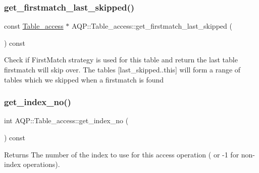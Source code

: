 \subsubsection{\texorpdfstring{get\+\_\+firstmatch\+\_\+last\+\_\+skipped()}{get\_firstmatch\_last\_skipped()}}
{\footnotesize\ttfamily const \mbox{\hyperlink{classAQP_1_1Table__access}{Table\+\_\+access}} $\ast$ A\+Q\+P\+::\+Table\+\_\+access\+::get\+\_\+firstmatch\+\_\+last\+\_\+skipped (\begin{DoxyParamCaption}{ }\end{DoxyParamCaption}) const}

Check if \textquotesingle{}First\+Match\textquotesingle{} strategy is used for this table and return the last table \textquotesingle{}firstmatch\textquotesingle{} will skip over. The tables \mbox{[}\textquotesingle{}last\+\_\+skipped\textquotesingle{}..\textquotesingle{}this\textquotesingle{}\mbox{]} will form a range of tables which we skipped when a \textquotesingle{}firstmatch\textquotesingle{} is found \mbox{\label{classAQP_1_1Table__access_a48078f34bde5ffd5b683e90b3cabc37b}} 
\subsubsection{\texorpdfstring{get\+\_\+index\+\_\+no()}{get\_index\_no()}}
{\footnotesize\ttfamily int A\+Q\+P\+::\+Table\+\_\+access\+::get\+\_\+index\+\_\+no (\begin{DoxyParamCaption}{ }\end{DoxyParamCaption}) const\hspace{0.3cm}{\ttfamily [inline]}}

\begin{DoxyReturn}{Returns}
The number of the index to use for this access operation ( or -\/1 for non-\/index operations). 
\end{DoxyReturn}
\mbox{\label{classAQP_1_1Table__access_afe29ae74c412b36511d0b42bbcb584a2}} 
